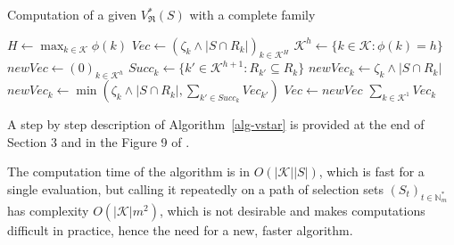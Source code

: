 \documentclass[
  11pt,
  a4paper,
]{article}
\theoremstyle{plain}
\theoremstyle{definition}
\theoremstyle{plain}
\theoremstyle{definition}
\theoremstyle{plain}
\theoremstyle{remark}
\begin{document}
\begin{algorithm}[htb!]
\caption{Computation of a given $V^*_{\mathfrak{R}}(S)$ with a complete family}
\label{alg-vstar}
\begin{algorithmic}[1]
  \State $ H \gets \max_{k\in\mathcal{K}} \phi(k)  $ 
  \State $Vec\gets (\zeta_{k}\wedge|S\cap R_k|)_{k \in  \mathcal{K}^H}$ 
    \State $\mathcal{K}^h\gets \{ k\in\mathcal{K} : \phi(k) =h  \}$
    \State $newVec\gets (0)_{k \in  \mathcal{K}^h}$
      \State $Succ_k \gets \{ k' \in  \mathcal{K}^{h+1} : R_{k'}\subseteq R_k\}$
        \State $newVec_k \gets \zeta_k\wedge|S\cap R_k|$
      \Else
        \State $newVec_k \gets \min\left( \zeta_{k}\wedge|S\cap R_k| ,  \sum_{k'\in Succ_k} Vec_{k'}   \right)$
      \EndIf
    \EndFor
    \State $Vec\gets newVec$
  \EndFor
  \State\Return $\sum_{k\in\mathcal{K}^1} Vec_k  $
\EndProcedure
\end{algorithmic}
\end{algorithm}

A step by step description of  Algorithm~\ref{alg-vstar}  is provided at
the end of Section 3 and in the Figure 9 of \citet{MR4178188}.

The computation time of the algorithm is in \(O(|\mathcal{K}||S|)\),
which is fast for a single evaluation, but calling it repeatedly on a
path of selection sets \((S_t)_{t\in\mathbb{N}_m^*}\) has complexity
\(O(|\mathcal{K}|m^2)\), which is not desirable and makes computations
difficult in practice, hence the need for a new, faster algorithm.
\end{document}
